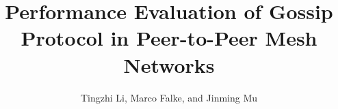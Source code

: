 \documentclass[12pt,journal]{IEEEtran}
\begin{document}
%
\title{Performance Evaluation of Gossip Protocol in Peer-to-Peer Mesh Networks}
%
%
%

\author{Tingzhi Li, Marco Falke, and Jinming Mu}%


% 
%



\end{document}
